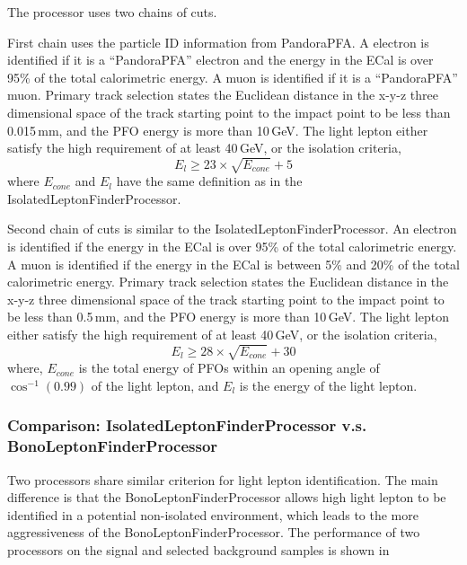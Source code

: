 The processor uses two chains of cuts.

First chain uses the particle ID information from PandoraPFA. A electron is identified if it is a ``PandoraPFA'' electron and the energy in the ECal is over 95\% of the total calorimetric energy. A muon is identified if it is a ``PandoraPFA'' muon.  Primary track selection states the Euclidean distance in the x-y-z three dimensional space of the track starting point to the impact point to be less than 0.015\,mm, and the PFO energy is more than 10\,GeV. The light lepton either satisfy the high \pT requirement of at least 40\,GeV, or the isolation criteria,
\begin{equation}
E_{l} \geqslant 23 \times \sqrt{E_{cone}} + 5
\end{equation}
where $E_{cone}$ and $E_{l}$ have the same definition as in the IsolatedLeptonFinderProcessor.

Second chain of cuts is similar to the IsolatedLeptonFinderProcessor. An electron is identified if the energy in the ECal is over 95\% of the total calorimetric energy. A muon is identified if the energy in the ECal is between 5\% and 20\% of the total calorimetric energy. Primary track selection states the Euclidean distance in the x-y-z three dimensional space of the track starting point to the impact point to be less than 0.5\,mm, and the PFO energy is more than 10\,GeV. The light lepton either satisfy the high \pT requirement of at least 40\,GeV, or the isolation criteria,
\begin{equation}
E_{l} \geqslant 28 \times \sqrt{E_{cone}} + 30
\end{equation}
where, $E_{cone}$ is the total energy of PFOs within an opening angle of $\cos^{-1}(0.99)$ of the light lepton, and $E_{l}$ is the energy of the light lepton.

\subsubsection{Comparison: IsolatedLeptonFinderProcessor v.s. BonoLeptonFinderProcessor}

Two processors share similar criterion for light lepton identification. The main difference is that the BonoLeptonFinderProcessor allows high \pT light lepton to be identified in a potential non-isolated environment, which leads to the more aggressiveness of the BonoLeptonFinderProcessor. The performance of two processors on the signal and selected background samples is shown in 


